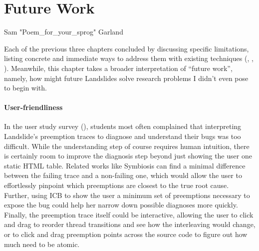 \chapter{Future Work}
\label{chap:warpzone}
{Sam "Poem\_for\_your\_sprog" Garland}

Each of the previous three chapters concluded by
discussing specific limitations,
listing concrete and immediate ways to address them
with existing techniques
(\sect{\ref{sec:quicksand-discussion}},
\sect{\ref{sec:education-discussion}},
\sect{\ref{sec:tm-discussion}}).
Meanwhile, this chapter takes a broader interpretation of ``future work'',
namely,
how might future Landslides solve research problems I didn't even pose to begin with.

\subsubsection{User-friendliness}

In the user study survey (\sect{\ref{sec:education-eval-survey}}),
students most often complained
that interpreting Landslide's preemption traces to diagnose and understand their bugs was too difficult.
While the understanding step of course requires human intuition,
there is certainly room to improve the diagnosis step beyond just showing the user one static HTML table.
Related works like Symbiosis \cite{symbiosis} can find a minimal difference between the failing trace and a non-failing one,
which would allow the user to effortlessly pinpoint which preemptions are closest to the true root cause.
Further, using ICB \cite{chess-icb} to show the user a minimum set of preemptions necessary to expose the bug
could help her narrow down possible diagnoses more quickly.
Finally, the preemption trace itself could be interactive,
allowing the user to click and drag to reorder thread transitions and see how the interleaving would change,
or to click and drag preemption points across the source code to figure out how much need to be atomic.

